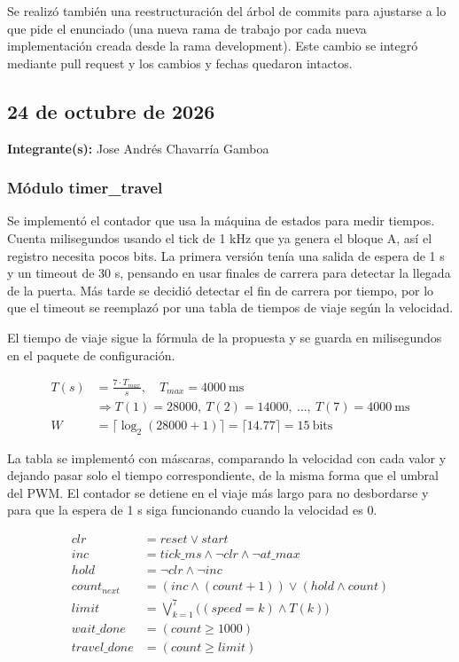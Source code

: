\documentclass[11pt,letterpaper]{article}
\newcommand{\entrada}[2]{%
  \subsection*{#1}%
  \addcontentsline{toc}{subsection}{#1}%
  \noindent\textbf{Integrante(s):} #2\par\medskip
}
\begin{document}
Se realizó también una reestructuración del árbol de commits para ajustarse a lo que pide el enunciado (una nueva rama de trabajo por cada nueva implementación creada desde la rama development). Este cambio se integró mediante pull request y los cambios y fechas quedaron intactos.

\entrada{24 de octubre de 2026}{Jose Andrés Chavarría Gamboa}
 
\subsubsection*{Módulo timer\_travel}
 
Se implementó el contador que usa la máquina de estados para medir tiempos. Cuenta milisegundos usando el tick de 1 kHz que ya genera el bloque A, así el registro necesita pocos bits. La primera versión tenía una salida de espera de 1 s y un timeout de 30 s, pensando en usar finales de carrera para detectar la llegada de la puerta. Más tarde se decidió detectar el fin de carrera por tiempo, por lo que el timeout se reemplazó por una tabla de tiempos de viaje según la velocidad.
 
El tiempo de viaje sigue la fórmula de la propuesta y se guarda en milisegundos en el paquete de configuración.
 
\begin{align*}
T(s) &= \frac{7 \cdot T_{max}}{s}, \quad T_{max} = 4000\ \text{ms} \\
&\Rightarrow T(1) = 28000,\ T(2) = 14000,\ \ldots,\ T(7) = 4000\ \text{ms} \\
W &= \lceil \log_2(28000 + 1) \rceil = \lceil 14.77 \rceil = 15\ \text{bits}
\end{align*}
 
La tabla se implementó con máscaras, comparando la velocidad con cada valor y dejando pasar solo el tiempo correspondiente, de la misma forma que el umbral del PWM. El contador se detiene en el viaje más largo para no desbordarse y para que la espera de 1 s siga funcionando cuando la velocidad es 0.
 
\begin{align*}
clr &= reset \lor start \\
inc &= tick\_ms \land \lnot clr \land \lnot at\_max \\
hold &= \lnot clr \land \lnot inc \\
count_{next} &= (inc \land (count+1)) \lor (hold \land count) \\
limit &= \textstyle\bigvee_{k=1}^{7} \big( (speed = k) \land T(k) \big) \\
wait\_done &= (count \geq 1000) \\
travel\_done &= (count \geq limit)
\end{align*}
 
\end{document}
